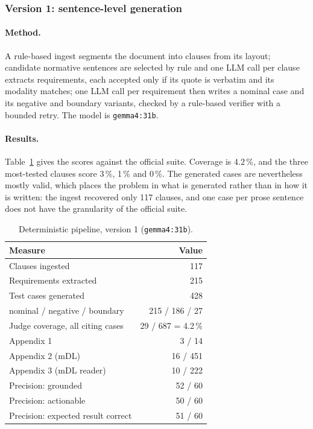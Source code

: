 \subsubsection{Version 1: sentence-level generation}
\label{sec:exp-sentence}

\paragraph{Method.}
A rule-based ingest segments the document into clauses from its layout;
candidate normative sentences are selected by rule and one LLM call per clause
extracts requirements, each accepted only if its quote is verbatim and its
modality matches; one LLM call per requirement then writes a
nominal case and its negative and boundary variants, checked by a rule-based
verifier with a bounded retry. The model is \texttt{gemma4:31b}.

\paragraph{Results.}
Table~\ref{tab:sentence} gives the scores against the official suite.
Coverage is
4.2\,\%, and the three most-tested clauses score 3\,\%, 1\,\% and 0\,\%. The
generated cases are nevertheless mostly valid, which places the problem in
what is generated rather than in how it is written: the ingest recovered only
117 clauses, and one case per prose sentence does not have the granularity of
the official suite.

\begin{table}[t]
  \centering
  \caption{Deterministic pipeline, version 1 (\texttt{gemma4:31b}).}
  \label{tab:sentence}
  \begin{tabular}{lr}
    \toprule
    Measure & Value \\
    \midrule
    Clauses ingested                 & 117 \\
    Requirements extracted           & 215 \\
    Test cases generated             & 428 \\
    \quad nominal / negative / boundary & 215 / 186 / 27 \\
    \midrule
    Judge coverage, all citing cases & 29 / 687 = 4.2\,\% \\
    \quad Appendix 1                 & 3 / 14 \\
    \quad Appendix 2 (mDL)           & 16 / 451 \\
    \quad Appendix 3 (mDL reader)    & 10 / 222 \\
    \midrule
    Precision: grounded              & 52 / 60 \\
    Precision: actionable            & 50 / 60 \\
    Precision: expected result correct & 51 / 60 \\
    \bottomrule
  \end{tabular}
\end{table}

